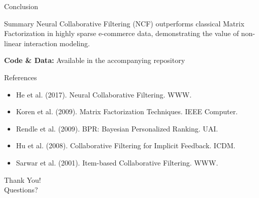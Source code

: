 \documentclass{beamer}
\begin{document}
\begin{frame}{Conclusion}
\begin{block}{Summary}
Neural Collaborative Filtering (NCF) outperforms classical Matrix Factorization in highly sparse e-commerce data, demonstrating the value of non-linear interaction modeling.
\end{block}
\vspace{0.5cm}
\textbf{Code \& Data:} Available in the accompanying repository
\end{frame}

\begin{frame}{References}
\footnotesize
\begin{itemize}
    \item He et al. (2017). Neural Collaborative Filtering. WWW.
    \item Koren et al. (2009). Matrix Factorization Techniques. IEEE Computer.
    \item Rendle et al. (2009). BPR: Bayesian Personalized Ranking. UAI.
    \item Hu et al. (2008). Collaborative Filtering for Implicit Feedback. ICDM.
    \item Sarwar et al. (2001). Item-based Collaborative Filtering. WWW.
\end{itemize}
\end{frame}

\begin{frame}
\begin{center}
\Huge Thank You!\\
\vspace{1cm}
\Large Questions?
\end{center}
\end{frame}
\end{document}
